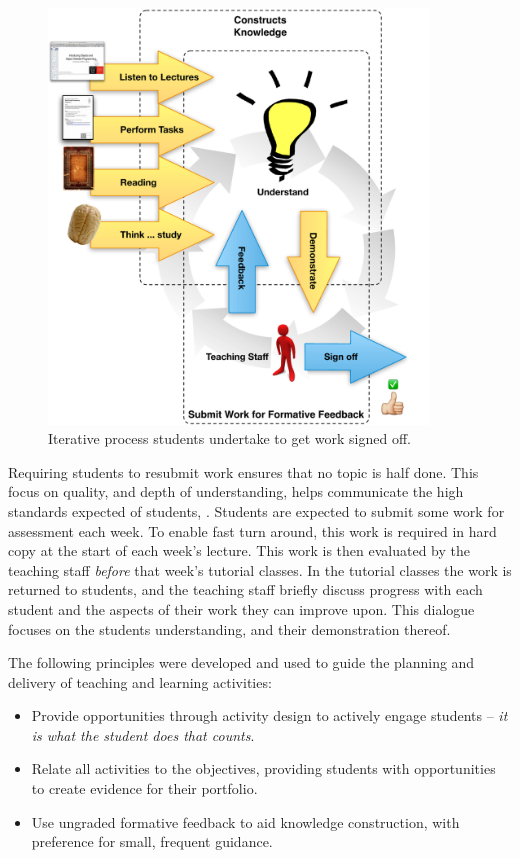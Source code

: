 \begin{figure}[p]
	\centering
	\includegraphics[width=0.9\textwidth]{ConstructKnowledge}
	\caption{Iterative process students undertake to get work signed off.}
	\label{fig:construct_knowledge}
\end{figure}

Requiring students to resubmit work ensures that no topic is half done. This focus on quality, and depth of understanding, helps communicate the high standards expected of students, . Students are expected to submit some work for assessment each week. To enable fast turn around, this work is required in hard copy at the start of each week's lecture. This work is then evaluated by the teaching staff \emph{before} that week's tutorial classes. In the tutorial classes the work is returned to students, and the teaching staff briefly discuss progress with each student and the aspects of their work they can improve upon. This dialogue focuses on the students understanding, and their demonstration thereof.

The following principles were developed and used to guide the planning and delivery of teaching and learning activities:

\begin{itemize}
  \item Provide opportunities through activity design to actively engage students -- \emph{it is what the student does that counts}.  
  \item Relate all activities to the objectives, providing students with opportunities to create evidence for their portfolio.
  \item Use ungraded formative feedback to aid knowledge construction, with preference for small, frequent guidance.
\end{itemize}

